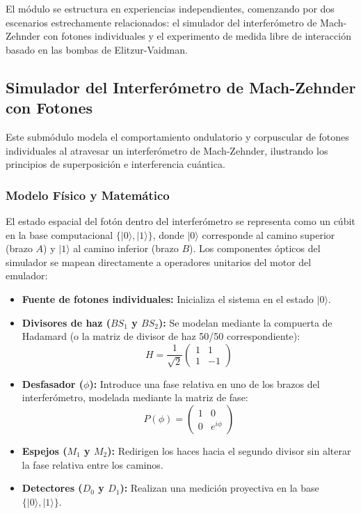 \documentclass{article}
\begin{document}
El módulo se estructura en experiencias independientes, comenzando por dos escenarios estrechamente relacionados: el simulador del interferómetro de Mach-Zehnder con fotones individuales y el experimento de medida libre de interacción basado en las bombas de Elitzur-Vaidman.

\subsection{Simulador del Interferómetro de Mach-Zehnder con Fotones}

Este submódulo modela el comportamiento ondulatorio y corpuscular de fotones individuales al atravesar un interferómetro de Mach-Zehnder, ilustrando los principios de superposición e interferencia cuántica.

\subsubsection{Modelo Físico y Matemático}
El estado espacial del fotón dentro del interferómetro se representa como un cúbit en la base computacional $\{|0\rangle, |1\rangle\}$, donde $|0\rangle$ corresponde al camino superior (brazo $A$) y $|1\rangle$ al camino inferior (brazo $B$). Los componentes ópticos del simulador se mapean directamente a operadores unitarios del motor del emulador:

\begin{itemize}
    \item \textbf{Fuente de fotones individuales:} Inicializa el sistema en el estado $|0\rangle$.
    \item \textbf{Divisores de haz ($BS_1$ y $BS_2$):} Se modelan mediante la compuerta de Hadamard (o la matriz de divisor de haz 50/50 correspondiente):
    \begin{equation}
        H = \frac{1}{\sqrt{2}} \begin{pmatrix} 1 & 1 \\ 1 & -1 \end{pmatrix}
    \end{equation}
    \item \textbf{Desfasador ($\phi$):} Introduce una fase relativa en uno de los brazos del interferómetro, modelada mediante la matriz de fase:
    \begin{equation}
        P(\phi) = \begin{pmatrix} 1 & 0 \\ 0 & e^{i\phi} \end{pmatrix}
    \end{equation}
    \item \textbf{Espejos ($M_1$ y $M_2$):} Redirigen los haces hacia el segundo divisor sin alterar la fase relativa entre los caminos.
    \item \textbf{Detectores ($D_0$ y $D_1$):} Realizan una medición proyectiva en la base $\{|0\rangle, |1\rangle\}$.
\end{itemize}
\end{document}
